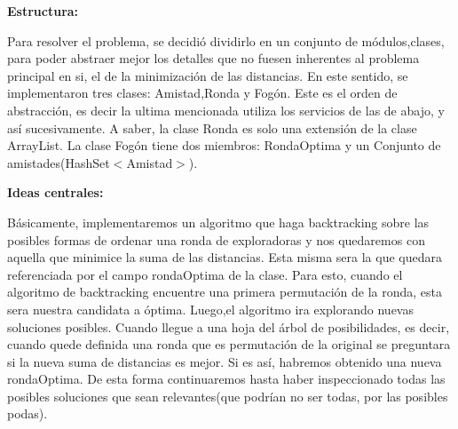 \documentclass[10pt, a4paper]{article}
\begin{document}
\begin{flushleft}
\textbf{Estructura:}\\
\end{flushleft}

Para resolver el problema, se decidió dividirlo en un conjunto de módulos,clases, para poder abstraer mejor los detalles que no fuesen inherentes al problema principal en si, el de la minimización de las distancias.
En este sentido, se implementaron tres clases: Amistad,Ronda y Fogón. Este es el orden de abstracción, es decir la ultima mencionada utiliza los servicios de las de abajo, y así sucesivamente. A saber, la clase Ronda es solo una extensión de la clase ArrayList. La clase Fogón tiene dos miembros: RondaOptima y un Conjunto de amistades(HashSet$<$Amistad$>$).

	
\begin{flushleft}
\textbf{Ideas centrales:}\\
\end{flushleft}

Básicamente, implementaremos un algoritmo que haga backtracking sobre las posibles formas de ordenar una ronda de exploradoras y nos quedaremos con aquella que minimice la suma de las distancias. Esta misma sera la que quedara referenciada por el campo rondaOptima de la clase.
Para esto, cuando el algoritmo de backtracking encuentre una primera permutación de la ronda, esta sera nuestra candidata a óptima. Luego,el algoritmo ira explorando nuevas soluciones posibles. Cuando llegue a una hoja del árbol de posibilidades, es decir, cuando quede definida una ronda que es permutación de la original se preguntara si la nueva suma de distancias es mejor. Si es así, habremos obtenido una nueva rondaOptima. De esta forma continuaremos hasta haber inspeccionado todas las posibles soluciones que sean relevantes(que podrían no ser todas, por las posibles podas).
\end{document}
